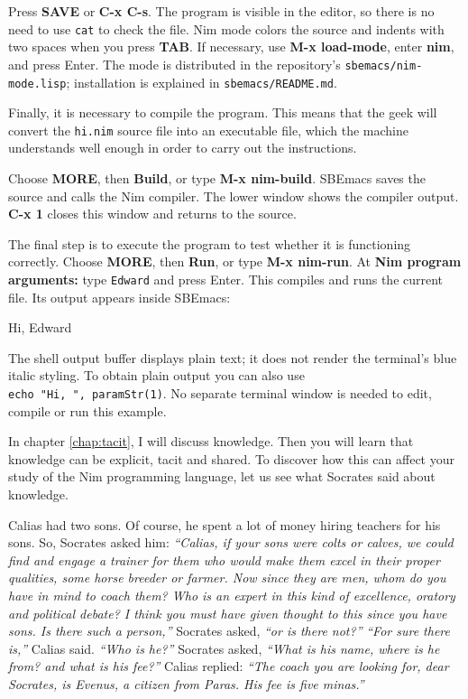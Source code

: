 \documentclass[
  12pt,
]{book}
\newenvironment{Shaded}{}{}
\newcommand{\NormalTok}[1]{#1}
\begin{document}
Press \textbf{SAVE} or \textbf{C-x C-s}. The program is visible in the
editor, so there is no need to use \texttt{cat} to check the file. Nim
mode colors the source and indents with two spaces when you press
\textbf{TAB}. If necessary, use \textbf{M-x load-mode}, enter
\textbf{nim}, and press Enter. The mode is distributed in the
repository's \texttt{sbemacs/nim-mode.lisp}; installation is explained
in \texttt{sbemacs/README.md}.

Finally, it is necessary to compile the program. This means that the
geek will convert the \texttt{hi.nim} source file into an executable
file, which the machine understands well enough in order to carry out
the instructions.

Choose \textbf{MORE}, then \textbf{Build}, or type \textbf{M-x
nim-build}. SBEmacs saves the source and calls the Nim compiler. The
lower window shows the compiler output. \textbf{C-x 1} closes this
window and returns to the source.

The final step is to execute the program to test whether it is
functioning correctly. Choose \textbf{MORE}, then \textbf{Run}, or type
\textbf{M-x nim-run}. At \textbf{Nim program arguments:} type
\texttt{Edward} and press Enter. This compiles and runs the current
file. Its output appears inside SBEmacs:

\begin{Shaded}
\begin{Highlighting}[]
\NormalTok{Hi, Edward}
\end{Highlighting}
\end{Shaded}

The shell output buffer displays plain text; it does not render the
terminal's blue italic styling. To obtain plain output you can also use
\texttt{echo\ "Hi,\ ",\ paramStr(1)}. No separate terminal window is
needed to edit, compile or run this example.

In chapter \ref{chap:tacit}, I will discuss knowledge. Then you will
learn that knowledge can be explicit, tacit and shared. To discover how
this can affect your study of the Nim programming language, let us see
what Socrates said about knowledge.

Calias had two sons. Of course, he spent a lot of money hiring teachers
for his sons. So, Socrates asked him: \emph{``Calias, if your sons were
colts or calves, we could find and engage a trainer for them who would
make them excel in their proper qualities, some horse breeder or farmer.
Now since they are men, whom do you have in mind to coach them? Who is
an expert in this kind of excellence, oratory and political debate? I
think you must have given thought to this since you have sons. Is there
such a person,''} Socrates asked, \emph{``or is there not?''}
\emph{``For sure there is,''} Calias said. \emph{``Who is he?''}
Socrates asked, \emph{``What is his name, where is he from? and what is
his fee?''} Calias replied: \emph{``The coach you are looking for, dear
Socrates, is Evenus, a citizen from Paras. His fee is five minas.''}
\end{document}
